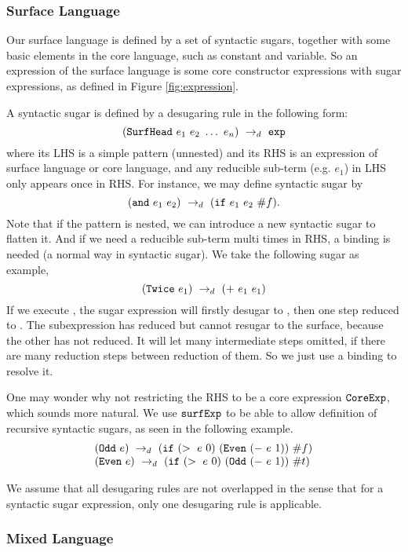 \subsubsection{Surface Language}

Our surface language is defined by a set of syntactic sugars, together with some basic elements in the core language, such as constant and variable. So an expression of the surface language is some core constructor expressions with sugar expressions, as defined in Figure \ref{fig:expression}.

A syntactic sugar is defined by a desugaring rule in the following form:
\[
(\mbox{\tt SurfHead}~e_1~e_2~\ldots~e_n) ~\rightarrow_d~ \mbox{\tt exp}
\]
where its LHS is a simple pattern (unnested) and its RHS is an expression of surface language or core language, and any reducible sub-term (e.g. $e_1$) in LHS only appears once in RHS. For instance, we may define syntactic sugar  by
\[
(\mbox{\tt and}~e_1~e_2) ~\rightarrow_d~ (\mbox{\tt if}~e_1~e_2~\#f).
\]
Note that if the pattern is nested, we can introduce a new syntactic sugar to flatten it. And if we need a reducible sub-term multi times in RHS, a  binding is needed (a normal way in syntactic sugar). We take the following sugar as example,
\[(\mbox{\tt Twice}~e_1) ~\rightarrow_d~ (+~e_1~e_1)\]
If we execute , the sugar expression will firstly desugar to , then one step reduced to . The subexpression  has reduced but cannot resugar to the surface, because the other  has not reduced. It will let many intermediate steps omitted, if there are many reduction steps between reduction of them. So we just use a  binding to resolve it.

One may wonder why  not restricting the RHS to be a core expression $\mbox{\tt CoreExp}$, which sounds more natural. We use $\mbox{\tt surfExp}$ to be able to allow definition of recursive syntactic sugars, as seen in the following example.
\[
\begin{array}{l}
(\mbox{\tt Odd}~e) ~\rightarrow_d~ (\mbox{\tt if}~(>~e~0)~(\mbox{\tt Even}~(-~e~1))~\#f)\\
(\mbox{\tt Even}~e) ~\rightarrow_d~ (\mbox{\tt if}~(>~e~0)~(\mbox{\tt Odd}~(-~e~1))~\#t)
\end{array}
\]

We assume that all desugaring rules are not overlapped in the sense that for a syntactic sugar expression, only one desugaring rule is applicable. 


\subsubsection{Mixed Language}

